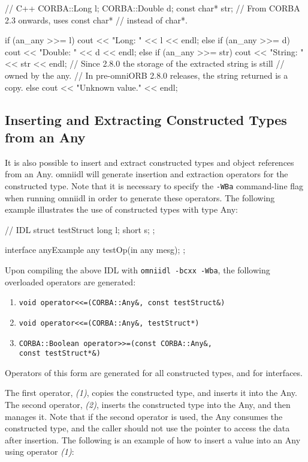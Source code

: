 \documentclass[11pt,twoside,a4paper]{book}
\begin{document}
\begin{cxxlisting}
// C++
CORBA::Long l;
CORBA::Double d;
const char* str;     // From CORBA 2.3 onwards, uses const char*
                     // instead of char*. 

if (an_any >>= l) {
    cout << "Long: " << l << endl;
}
else if (an_any >>= d) {
    cout << "Double: " << d << endl;
}
else if (an_any >>= str) {
    cout << "String: " << str << endl;
    // Since 2.8.0 the storage of the extracted string is still
    // owned by the any.
    // In pre-omniORB 2.8.0 releases, the string returned is a copy.
}
else {
    cout << "Unknown value." << endl;
}
\end{cxxlisting}


\subsection{Inserting and Extracting Constructed Types from an Any}

It is also possible to insert and extract constructed types and object
references from an Any. omniidl will generate insertion and extraction
operators for the constructed type. Note that it is necessary to
specify the \texttt{-WBa} command-line flag when running omniidl in
order to generate these operators. The following example illustrates
the use of constructed types with type Any:

\begin{idllisting}
// IDL
struct testStruct {
  long l;
  short s;
};

interface anyExample {
  any testOp(in any mesg);
};
\end{idllisting}

Upon compiling the above IDL with \texttt{omniidl -bcxx -Wba}, the
following overloaded operators are generated:

\begin{enumerate}
\item \verb|void operator<<=(CORBA::Any&, const testStruct&)|
\item \verb|void operator<<=(CORBA::Any&, testStruct*)|
\item \verb|CORBA::Boolean operator>>=(const CORBA::Any&,|\\
      \verb|const testStruct*&)|
\end{enumerate}

Operators of this form are generated for all constructed types, and
for interfaces.

The first operator, \emph{(1)}, copies the constructed type, and
inserts it into the Any. The second operator, \emph{(2)}, inserts the
constructed type into the Any, and then manages it. Note that if the
second operator is used, the Any consumes the constructed type, and
the caller should not use the pointer to access the data after
insertion. The following is an example of how to insert a value into
an Any using operator \emph{(1)}:
\end{document}
